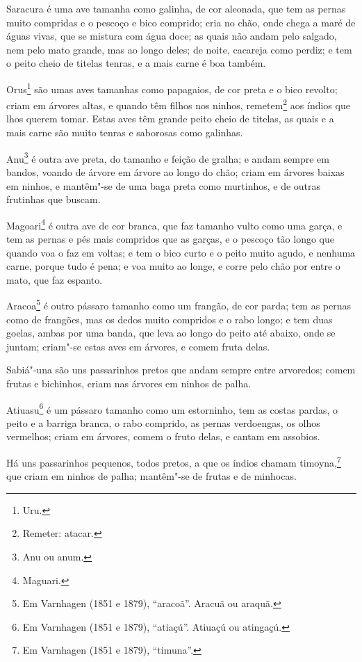 Saracura é uma ave tamanha como galinha, de cor aleonada, que tem as pernas muito
compridas e o pescoço e bico comprido; cria no chão, onde chega a maré de águas vivas, que
se mistura com água doce; as quais não andam pelo salgado, nem pelo mato grande, mas ao
longo deles; de noite, cacareja como perdiz; e tem o peito cheio de titelas tenras, e a
mais carne é boa também.

Orus\footnote{ Uru.} são umas aves tamanhas como papagaios, de cor preta e o bico revolto;
criam em árvores altas, e quando têm filhos nos ninhos, remetem\footnote{ Remeter:
atacar.} aos índios que lhos querem tomar. Estas aves têm grande peito cheio de
titelas, as quais e a mais carne são muito tenras e saborosas como galinhas.

Anu\footnote{ Anu ou anum.} é outra ave preta, do tamanho e feição de gralha; e andam
sempre em bandos, voando de árvore em árvore ao longo do chão; criam em árvores baixas em
ninhos, e mantêm"-se de uma baga preta como murtinhos, e de outras frutinhas que buscam.

Magoari\footnote{ Maguari.} é outra ave de cor branca, que faz tamanho vulto como uma
garça, e tem as pernas e pés mais compridos que as garças, e o pescoço tão longo que
quando voa o faz em voltas; e tem o bico curto e o peito muito agudo, e nenhuma carne,
porque tudo é pena; e voa muito ao longe, e corre pelo chão por entre o mato, que faz
espanto.

Aracoa\footnote{ Em Varnhagen (1851 e 1879), ``aracoã''. Aracuã ou araquã.} é outro
pássaro tamanho como um frangão, de cor parda; tem as pernas como de frangões, mas os
dedos muito compridos e o rabo longo; e tem duas goelas, ambas por uma banda, que leva ao
longo do peito até abaixo, onde se juntam; criam"-se estas aves em árvores, e comem fruta
delas.

Sabiá"-una são uns passarinhos pretos que andam sempre entre arvoredos; comem frutas e
bichinhos, criam nas árvores em ninhos de palha.

Atiuasu\footnote{ Em Varnhagen (1851 e 1879), ``atiaçú''. Atiuaçú ou atingaçú.} é um
pássaro tamanho como um estorninho, tem as costas pardas, o peito e a barriga branca, o
rabo comprido, as pernas verdoengas, os olhos vermelhos; criam em árvores, comem o fruto
delas, e cantam em assobios.

Há uns passarinhos pequenos, todos pretos, a que os índios chamam timoyna,\footnote{ Em
Varnhagen (1851 e 1879), ``timuna''.} que criam em ninhos de palha; mantêm"-se de frutas e
de minhocas.


